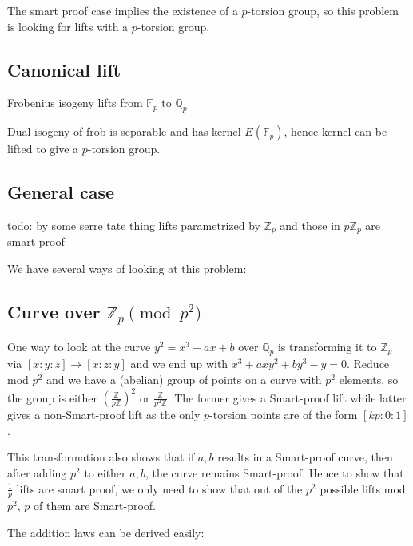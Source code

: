 \documentclass{article}
\newcommand{\mb}
{\mathbb}
\begin{document}
The smart proof case implies the existence of a $p$-torsion group, so this problem is looking for lifts with a $p$-torsion group.

\subsection{Canonical lift}

Frobenius isogeny lifts from $\mb F_p$ to $\mb Q_p$

Dual isogeny of frob is separable and has kernel $E\left(\mb F_p\right)$, hence kernel can be lifted to give a $p$-torsion group.

\subsection{General case}

todo: by some serre tate thing lifts parametrized by $\mb Z_p$ and those in $p\mb Z_p$ are smart proof

\iffalse

We have several ways of looking at this problem:

\subsection{Curve over $\mb Z_p\pmod{p^2}$}

One way to look at the curve $y^2=x^3+ax+b$ over $\mb Q_p$ is transforming it to $\mb Z_p$ via $[x:y:z]\to[x:z:y]$ and we end up with $x^3+axy^2+by^3-y=0$. Reduce mod $p^2$ and we have a (abelian) group of points on a curve with $p^2$ elements, so the group is either $\left(\frac{\mb Z}{p\mb Z}\right)^2$ or $\frac{\mb Z}{p^2\mb Z}$. The former gives a Smart-proof lift while latter gives a non-Smart-proof lift as the only $p$-torsion points are of the form $[kp:0:1]$.

This transformation also shows that if $a,b$ results in a Smart-proof curve, then after adding $p^2$ to either $a,b$, the curve remains Smart-proof. Hence to show that $\frac1p$ lifts are smart proof, we only need to show that out of the $p^2$ possible lifts mod $p^2$, $p$ of them are Smart-proof.

The addition laws can be derived easily:
\end{document}
